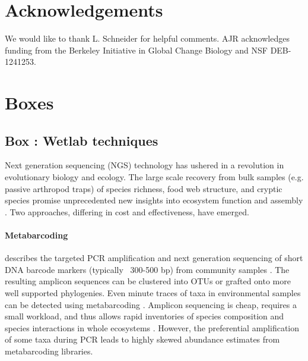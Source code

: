\documentclass[12pt]{article}
\newcounter{Box}
\begin{document}
\section*{Acknowledgements}

We would like to thank L. Schneider for helpful comments. AJR
acknowledges funding from the Berkeley Initiative in Global Change
Biology and NSF DEB-1241253.

\pagebreak




\pagebreak

\section*{Boxes}


\label{box:wet}
\subsection*{Box \theBox: Wetlab techniques}
    
Next generation sequencing (NGS) technology has ushered in a revolution in
evolutionary biology and ecology. The large scale recovery from bulk
samples (e.g. passive arthropod traps) of species richness, food web
structure, and cryptic species promise unprecedented new insights into
ecosystem function and assembly \citep{krehenwinkel2016,
  shokralla2015, gibson2014, taberlet2012}.  Two approaches, differing
in cost and effectiveness, have emerged.

\paragraph{Metabarcoding} describes the targeted PCR amplification and
next generation sequencing of short DNA barcode markers (typically
~300-500 bp) from community samples \citep{ji2013}. The resulting
amplicon sequences can be clustered into OTUs or grafted onto more
well supported phylogenies. Even minute traces of taxa in
environmental samples can be detected using metabarcoding
\citep{bohmann2014}.  Amplicon sequencing is cheap, requires a small
workload, and thus allows rapid inventories of species composition and
species interactions in whole ecosystems \citep{gibson2014,
  leray2015}. However, the preferential amplification of some taxa
during PCR leads to highly skewed abundance estimates
\citep{elbrecht2015} from metabarcoding libraries.
\end{document}
